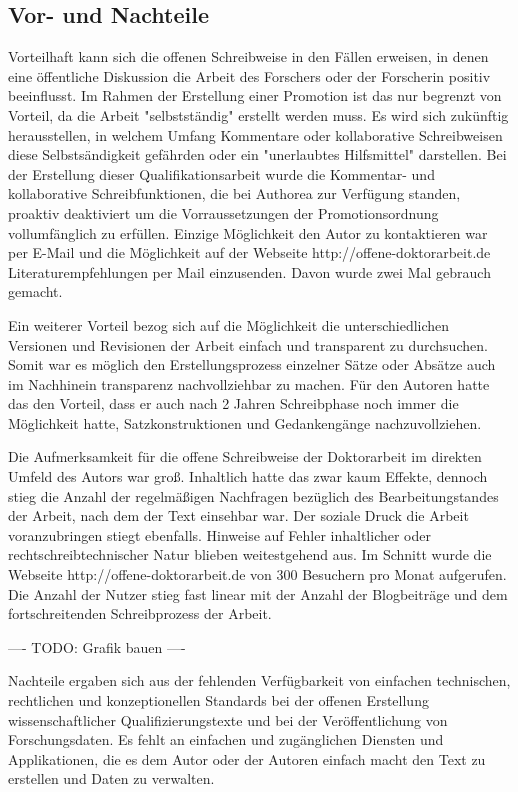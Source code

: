 \subsection{Vor- und Nachteile}

Vorteilhaft kann sich die offenen Schreibweise in den Fällen erweisen, in denen eine öffentliche Diskussion die Arbeit des Forschers oder der Forscherin positiv beeinflusst. Im Rahmen der Erstellung einer Promotion ist das nur begrenzt von Vorteil, da die Arbeit "selbstständig" erstellt werden muss. Es wird sich zukünftig herausstellen, in welchem Umfang Kommentare oder kollaborative Schreibweisen diese Selbstsändigkeit gefährden oder ein "unerlaubtes Hilfsmittel" \cite{promotionsordnung_leuphana_kuwi_2011} darstellen. Bei der Erstellung dieser Qualifikationsarbeit wurde die Kommentar- und kollaborative Schreibfunktionen, die bei Authorea zur Verfügung standen, proaktiv deaktiviert um die Vorraussetzungen der Promotionsordnung vollumfänglich zu erfüllen. Einzige Möglichkeit den Autor zu kontaktieren war per E-Mail und die Möglichkeit auf der Webseite http://offene-doktorarbeit.de Literaturempfehlungen per Mail einzusenden. Davon wurde zwei Mal gebrauch gemacht.

Ein weiterer Vorteil bezog sich auf die Möglichkeit die unterschiedlichen Versionen und Revisionen der Arbeit einfach und transparent zu durchsuchen. Somit war es möglich den Erstellungsprozess einzelner Sätze oder Absätze auch im Nachhinein transparenz nachvollziehbar zu machen. Für den Autoren hatte das den Vorteil, dass er auch nach 2 Jahren Schreibphase noch immer die Möglichkeit hatte, Satzkonstruktionen und Gedankengänge nachzuvollziehen.

Die Aufmerksamkeit für die offene Schreibweise der Doktorarbeit im direkten Umfeld des Autors war groß. Inhaltlich hatte das zwar kaum Effekte, dennoch stieg die Anzahl der regelmäßigen Nachfragen bezüglich des Bearbeitungstandes der Arbeit, nach dem der Text einsehbar war. Der soziale Druck die Arbeit voranzubringen stiegt ebenfalls. Hinweise auf Fehler inhaltlicher oder rechtschreibtechnischer Natur blieben weitestgehend aus. Im Schnitt wurde die Webseite http://offene-doktorarbeit.de von 300 Besuchern pro Monat aufgerufen. Die Anzahl der Nutzer stieg fast linear mit der Anzahl der Blogbeiträge und dem fortschreitenden Schreibprozess der Arbeit.

---- TODO: Grafik bauen ----

Nachteile ergaben sich aus der fehlenden Verfügbarkeit von einfachen technischen, rechtlichen und konzeptionellen Standards bei der offenen Erstellung wissenschaftlicher Qualifizierungstexte und bei der Veröffentlichung von Forschungsdaten. Es fehlt an einfachen und zugänglichen Diensten und Applikationen, die es dem Autor oder der Autoren einfach macht den Text zu erstellen und Daten zu verwalten.

